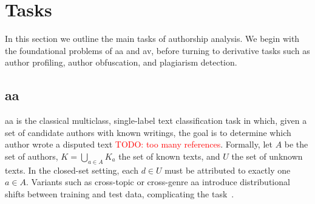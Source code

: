 \section{Tasks}

In this section we outline the main tasks of authorship analysis. 
We begin with the foundational problems of \ac{aa} and \ac{av}, before turning to derivative tasks such as author profiling,  author obfuscation, and plagiarism detection.

\subsection{\Acl{aa}}
\ac{aa} is the classical multiclass, single-label text classification task in which, given a set of candidate authors with known writings, the goal is to determine which author wrote a disputed text %
    \textcolor{red}{TODO: too many references}. 
Formally, let $A$ be the set of authors, $K=\bigcup_{a\in A} K_a$ the set of known texts, and $U$ the set of unknown texts. 
In the closed-set setting, each $d \in U$ must be attributed to exactly one $a \in A$. 
Variants such as cross-topic or cross-genre \ac{aa} introduce distributional shifts between training and test data, complicating the task~\citep{barlas_cross_domain_2020}.

